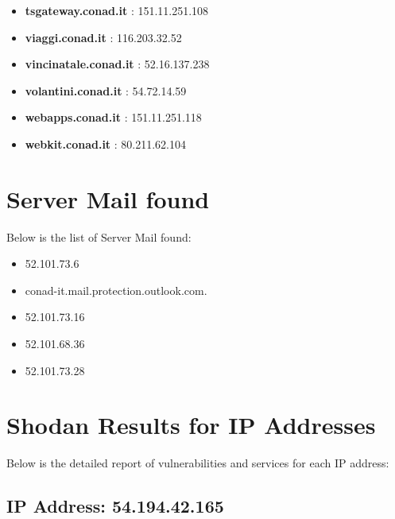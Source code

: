 \documentclass{article}
\begin{document}
\begin{itemize}
        \item \textbf{ tsgateway.conad.it }: 151.11.251.108
    
        \item \textbf{ viaggi.conad.it }: 116.203.32.52
    
        \item \textbf{ vincinatale.conad.it }: 52.16.137.238
    
        \item \textbf{ volantini.conad.it }: 54.72.14.59
    
        \item \textbf{ webapps.conad.it }: 151.11.251.118
    
        \item \textbf{ webkit.conad.it }: 80.211.62.104
    
\end{itemize}

\section*{Server Mail found}

Below is the list of Server Mail found:

\begin{itemize}
    
        \item 52.101.73.6
    
        \item conad-it.mail.protection.outlook.com.
    
        \item 52.101.73.16
    
        \item 52.101.68.36
    
        \item 52.101.73.28
    
\end{itemize}

\section*{Shodan Results for IP Addresses}

Below is the detailed report of vulnerabilities and services for each IP address:



\subsection*{IP Address: 54.194.42.165}
\end{document}
